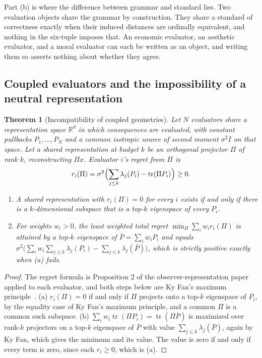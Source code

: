 \documentclass[11pt]{article}
\newtheorem{theorem}{Theorem}
\theoremstyle{definition}
\theoremstyle{remark}
\newcommand{\R}{\mathbb{R}}
\newcommand{\tr}{\operatorname{tr}}
\begin{document}
Part (b) is where the difference between grammar and standard lies.
Two evaluation objects share the grammar by construction.
They share a standard of correctness exactly when their induced distances are ordinally equivalent, and nothing in the six-tuple imposes that.
An economic evaluator, an aesthetic evaluator, and a moral evaluator can each be written as an object, and writing them so asserts nothing about whether they agree.

\subsection{Coupled evaluators and the impossibility of a neutral representation}

\begin{theorem}[Incompatibility of coupled geometries]
\label{thm:incompat}
Let $N$ evaluators share a representation space $\R^{d}$ in which consequences are evaluated, with constant pullbacks $P_{1},\dots,P_{N}$ and a common isotropic source of second moment $\sigma^{2}I$ on that space.
Let a shared representation at budget $k$ be an orthogonal projector $\Pi$ of rank $k$, reconstructing $\Pi x$.
Evaluator $i$'s regret from $\Pi$ is
\[
r_{i}(\Pi)=\sigma^{2}\Bigl(\sum_{j\le k}\lambda_{j}(P_{i})-\tr(\Pi P_{i})\Bigr)\ge0 .
\]
\begin{enumerate}
\item[(a)] A shared representation with $r_{i}(\Pi)=0$ for every $i$ exists if and only if there is a $k$-dimensional subspace that is a top-$k$ eigenspace of every $P_{i}$.
\item[(b)] For weights $w_{i}>0$, the least weighted total regret $\min_{\Pi}\sum_{i}w_{i}r_{i}(\Pi)$ is attained by a top-$k$ eigenspace of $\bar{P}=\sum_{i}w_{i}P_{i}$ and equals $\sigma^{2}\bigl(\sum_{i}w_{i}\sum_{j\le k}\lambda_{j}(P_{i})-\sum_{j\le k}\lambda_{j}(\bar{P})\bigr)$, which is strictly positive exactly when (a) fails.
\end{enumerate}
\end{theorem}

\begin{proof}
The regret formula is Proposition 2 of the observer-representation paper~\cite{bond2026or} applied to each evaluator, and both steps below are Ky Fan's maximum principle~\cite{fan1949}.
(a) $r_{i}(\Pi)=0$ if and only if $\Pi$ projects onto a top-$k$ eigenspace of $P_{i}$, by the equality case of Ky Fan's maximum principle, and a common $\Pi$ is a common such subspace.
(b) $\sum_{i}w_{i}\tr(\Pi P_{i})=\tr(\Pi\bar{P})$ is maximized over rank-$k$ projectors on a top-$k$ eigenspace of $\bar{P}$ with value $\sum_{j\le k}\lambda_{j}(\bar{P})$, again by Ky Fan, which gives the minimum and its value. The value is zero if and only if every term is zero, since each $r_{i}\ge0$, which is (a).
\end{proof}
\end{document}
